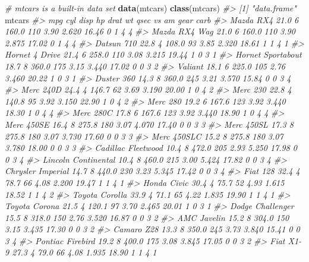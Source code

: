 \documentclass[]{book}
\newenvironment{Shaded}{}{}
\newcommand{\CommentTok}[1]{\textcolor[rgb]{0.38,0.63,0.69}{\textit{#1}}}
\newcommand{\KeywordTok}[1]{\textcolor[rgb]{0.00,0.44,0.13}{\textbf{#1}}}
\newcommand{\NormalTok}[1]{#1}
\theoremstyle{definition}
\theoremstyle{definition}
\theoremstyle{definition}
\theoremstyle{remark}
\begin{document}
\begin{Shaded}
\begin{Highlighting}[]
\CommentTok{# mtcars is a built-in data set}
\KeywordTok{data}\NormalTok{(mtcars)}
\KeywordTok{class}\NormalTok{(mtcars)}
\CommentTok{#> [1] "data.frame"}
\NormalTok{mtcars}
\CommentTok{#>                      mpg cyl  disp  hp drat    wt  qsec vs am gear carb}
\CommentTok{#> Mazda RX4           21.0   6 160.0 110 3.90 2.620 16.46  0  1    4    4}
\CommentTok{#> Mazda RX4 Wag       21.0   6 160.0 110 3.90 2.875 17.02  0  1    4    4}
\CommentTok{#> Datsun 710          22.8   4 108.0  93 3.85 2.320 18.61  1  1    4    1}
\CommentTok{#> Hornet 4 Drive      21.4   6 258.0 110 3.08 3.215 19.44  1  0    3    1}
\CommentTok{#> Hornet Sportabout   18.7   8 360.0 175 3.15 3.440 17.02  0  0    3    2}
\CommentTok{#> Valiant             18.1   6 225.0 105 2.76 3.460 20.22  1  0    3    1}
\CommentTok{#> Duster 360          14.3   8 360.0 245 3.21 3.570 15.84  0  0    3    4}
\CommentTok{#> Merc 240D           24.4   4 146.7  62 3.69 3.190 20.00  1  0    4    2}
\CommentTok{#> Merc 230            22.8   4 140.8  95 3.92 3.150 22.90  1  0    4    2}
\CommentTok{#> Merc 280            19.2   6 167.6 123 3.92 3.440 18.30  1  0    4    4}
\CommentTok{#> Merc 280C           17.8   6 167.6 123 3.92 3.440 18.90  1  0    4    4}
\CommentTok{#> Merc 450SE          16.4   8 275.8 180 3.07 4.070 17.40  0  0    3    3}
\CommentTok{#> Merc 450SL          17.3   8 275.8 180 3.07 3.730 17.60  0  0    3    3}
\CommentTok{#> Merc 450SLC         15.2   8 275.8 180 3.07 3.780 18.00  0  0    3    3}
\CommentTok{#> Cadillac Fleetwood  10.4   8 472.0 205 2.93 5.250 17.98  0  0    3    4}
\CommentTok{#> Lincoln Continental 10.4   8 460.0 215 3.00 5.424 17.82  0  0    3    4}
\CommentTok{#> Chrysler Imperial   14.7   8 440.0 230 3.23 5.345 17.42  0  0    3    4}
\CommentTok{#> Fiat 128            32.4   4  78.7  66 4.08 2.200 19.47  1  1    4    1}
\CommentTok{#> Honda Civic         30.4   4  75.7  52 4.93 1.615 18.52  1  1    4    2}
\CommentTok{#> Toyota Corolla      33.9   4  71.1  65 4.22 1.835 19.90  1  1    4    1}
\CommentTok{#> Toyota Corona       21.5   4 120.1  97 3.70 2.465 20.01  1  0    3    1}
\CommentTok{#> Dodge Challenger    15.5   8 318.0 150 2.76 3.520 16.87  0  0    3    2}
\CommentTok{#> AMC Javelin         15.2   8 304.0 150 3.15 3.435 17.30  0  0    3    2}
\CommentTok{#> Camaro Z28          13.3   8 350.0 245 3.73 3.840 15.41  0  0    3    4}
\CommentTok{#> Pontiac Firebird    19.2   8 400.0 175 3.08 3.845 17.05  0  0    3    2}
\CommentTok{#> Fiat X1-9           27.3   4  79.0  66 4.08 1.935 18.90  1  1    4    1}

\end{Highlighting}
\end{Shaded}
\end{document}
